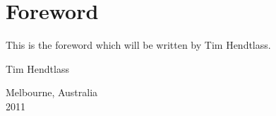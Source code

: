 % 
% 
\section*{Foreword}

This is the foreword which will be written by Tim Hendtlass.


\begin{flushright}
\vspace{1in}
Tim Hendtlass
\end{flushright}

\begin{flushleft}
\vspace{0.2in}
Melbourne, Australia \\
2011
\end{flushleft}